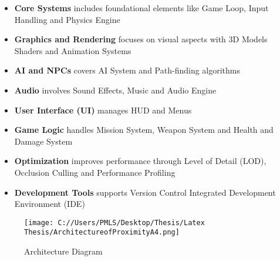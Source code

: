 \begin{itemize}
	\item \textbf{Core Systems} includes foundational elements like Game Loop, Input Handling and Physics Engine
	\item \textbf{Graphics and Rendering} focuses on visual aspects with 3D Models Shaders and Animation Systems
	\item \textbf{AI and NPCs} covers AI System and Path-finding algorithms
	\item \textbf{Audio} involves Sound Effects, Music and Audio Engine
	\item \textbf{User Interface (UI)} manages HUD and Menus
	\item \textbf{Game Logic} handles Mission System, Weapon System and Health and Damage System
	\item \textbf{Optimization} improves performance through	 Level of Detail (LOD), Occlusion Culling and	Performance Profiling
	\item \textbf{Development Tools} supports Version Control Integrated Development Environment (IDE)
\end{itemize}

\begin{figure}[H]
	\centering
	\texttt{[image: C://Users/PMLS/Desktop/Thesis/Latex Thesis/ArchitectureofProximityA4.png]}
	\caption{Architecture Diagram}
	\label{fig:Architecture Design Diagram}
\end{figure}


